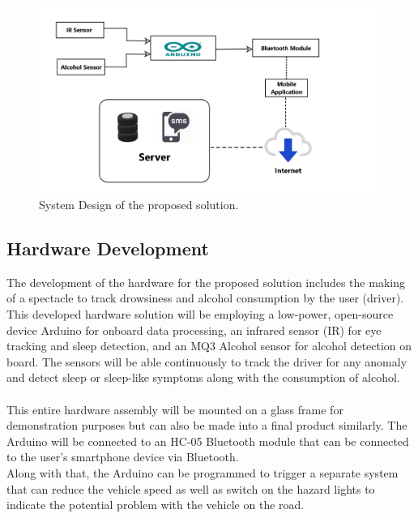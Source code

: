 \documentclass{article}
\begin{document}
\begin{figure}[ht]

\centering
\includegraphics[width=\textwidth]{eld_report.jpg}
\caption{System Design of the proposed solution.}

\end{figure}

\subsection{Hardware Development}
The development of the hardware for the proposed solution includes the making of a spectacle to track drowsiness and alcohol consumption by the user (driver). This developed hardware solution will be employing a low-power, open-source device Arduino for onboard data processing, an infrared sensor (IR) for eye tracking and sleep detection, and an MQ3 Alcohol sensor for alcohol detection on board. The sensors will be able continuously to track the driver for any anomaly and detect sleep or sleep-like symptoms along with the consumption of alcohol. \\ \\

This entire hardware assembly will be mounted on a glass frame for demonstration purposes but can also be made into a final product similarly. The Arduino will be connected to an HC-05 Bluetooth module that can be connected to the user's smartphone device via Bluetooth. \\

Along with that, the Arduino can be programmed to trigger a separate system that can reduce the vehicle speed as well as switch on the hazard lights to indicate the potential problem with the vehicle on the road. 
\end{document}
